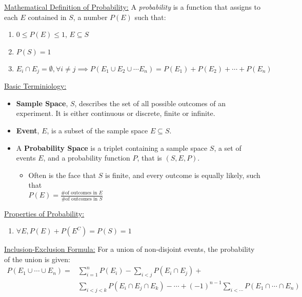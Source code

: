 \documentclass{article}
\newcommand{\sheader}[1]{\underline{#1:}}
\begin{document}
\sheader{Mathematical Definition of Probability}
A \textit{probability} is a function that assigns to each $E$ contained in $S$, a number $P(E)$ such that:
\begin{enumerate}
    \item $0 \leq P(E) \leq 1$, $E \subseteq S$
    \item $P(S) = 1$
    \item $E_i \cap E_j = \emptyset, \forall i \neq j \implies P(E_1 \cup E_2 \cup \cdots E_n) = P(E_1) + P(E_2) + \cdots + P(E_n)$    
\end{enumerate}

\sheader{Basic Terminiology}
\begin{itemize}
    \item \textbf{Sample Space}, $S$, describes the set of all possible outcomes of an experiment.
    It is either continuous or discrete, finite or infinite.
    \item \textbf{Event}, $E$, is a subset of the sample space $E \subseteq S$.
    \item A \textbf{Probability Space} is a triplet containing a sample space $S$, a set of events $E$,
    and a probability function $P$, that is $(S, E, P)$.
    \begin{itemize}
        \item Often is the face that $S$ is finite, and every outcome is equally likely, such that \\
        $P(E) = \frac{\textrm{\# of outcomes in } E}{\textrm{\# of outcomes in } S}$
    \end{itemize}
\end{itemize}

\sheader{Properties of Probability}
\begin{enumerate}
    \item $\forall E, P(E) + P(E^C) = P(S) = 1$
\end{enumerate}

\pagebreak

\sheader{Inclusion-Exclusion Formula} For a union of non-disjoint events, the probability of the union is given:
\begin{align*}
    P(E_1 \cup \cdots \cup E_n) = &\sum_{i = 1}^{n} P(E_i) - \sum_{i<j}P(E_i \cap E_j) + \\ 
    &\sum_{i < j < k}P(E_i \cap E_j \cap E_k) - \cdots + (-1)^{n -1}\sum_{i < \cdots}P(E_1 \cap \cdots \cap E_n)
\end{align*}
\end{document}
